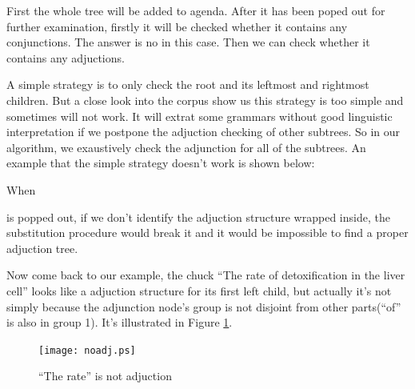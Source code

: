 \documentclass[a4paper]{article}
\begin{document}
First the whole tree will be added to agenda. After it has been poped out for further examination, firstly it will be checked whether it contains any conjunctions. The answer is no in this case. Then we can check whether it contains any adjuctions.

A simple strategy is to only check the root and its leftmost and rightmost children. But a close look into the corpus show us this strategy is too simple and sometimes will not work. It will extrat some grammars without good linguistic interpretation if we postpone the adjuction checking of other subtrees. So in our algorithm, we exaustively check the adjunction for all of the subtrees. An example that the simple strategy doesn't work is shown below:

\begin{center}
\end{center}
When 
\begin{center}
\end{center}
is popped out, if we don't identify the adjuction structure wrapped inside, the substitution procedure would break it and it would be impossible to find a proper adjuction tree.

Now come back to our example, the chuck ``The rate of detoxification in the liver cell'' looks like a adjuction structure for its first left child, but actually it's not simply because the adjunction node's group is not disjoint from other parts(``of'' is also in group 1). It's illustrated in Figure \ref{fig:no-adjunct}.

\begin{figure}[h]
    \begin{center}
        \texttt{[image: noadj.ps]}
    \end{center}
    \caption{``The rate'' is not adjuction}
    \label{fig:no-adjunct}
\end{figure}
\end{document}

